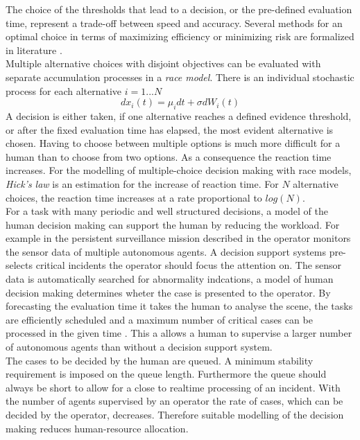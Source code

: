 \documentclass[a4paper,twoside, openright,12pt]{report}
\begin{document}
The choice of the thresholds that lead to a decision, or the pre-defined evaluation time, represent a trade-off between speed and accuracy. Several methods for an optimal choice in terms of maximizing efficiency or minimizing risk are formalized in literature \cite{Peters2015}.\\
Multiple alternative choices with disjoint objectives can be evaluated with separate accumulation processes in a \emph{race model}. There is an individual stochastic process for each alternative $i=1...N$
\begin{equation}
dx_i(t) = \mu_i dt + \sigma dW_i(t)
\end{equation}
 A decision is either taken, if one alternative reaches a defined evidence threshold, or after the fixed evaluation time has elapsed, the most evident alternative is chosen. Having to choose between multiple options is much more difficult for a human than to choose from two options. As a consequence the reaction time increases. For the modelling of multiple-choice decision making with race models, \emph{Hick's law} is an estimation for the increase of reaction time. For $N$ alternative choices, the reaction time increases at a rate proportional to $log(N)$.\\
For a task with many periodic and well structured decisions, a model of the human decision making can support the human by reducing the workload.  For example in the persistent surveillance mission described in \cite{Peters2015} the operator monitors the sensor data of multiple autonomous agents. A decision support systems pre-selects critical incidents the operator should focus the attention on. The sensor data is automatically searched for abnormality indcations, a model of human decision making determines wheter the case is presented to the operator. By forecasting the evaluation time it takes the human to analyse the scene, the tasks are efficiently scheduled and a maximum number of critical cases can be processed in the given time \cite{Bertuccelli2010}. This a allows a human to supervise a larger number of autonomous agents than without a decision support system.\\
The cases to be decided by the human are queued. A minimum stability requirement is imposed on the queue length. Furthermore the queue should always be short to allow for a close to realtime processing of an incident. With the number of agents supervised by an operator the rate of cases, which can be decided by the operator, decreases. Therefore suitable modelling of the decision making reduces human-resource allocation.
        
\end{document}

